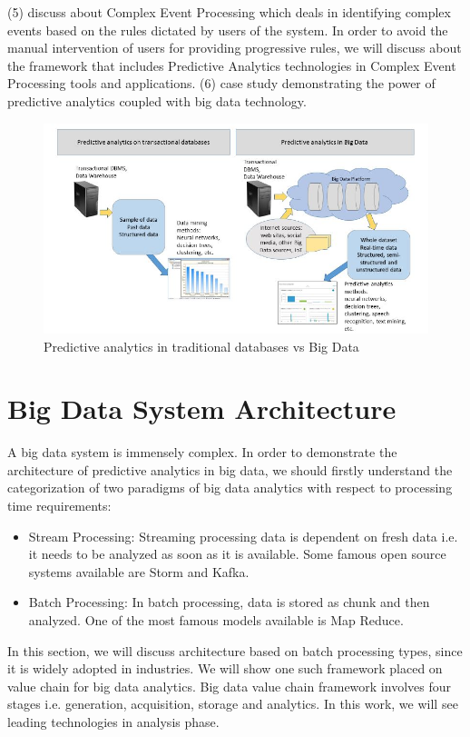 \documentclass[runningheads]{llncs}
\begin{document}
(5) discuss about Complex Event Processing which deals in identifying complex events based on the rules dictated by users of the system. In order to avoid the manual intervention of users for providing progressive rules, we will discuss about the framework that includes Predictive Analytics technologies in Complex Event Processing tools and applications. \newline
(6) case study demonstrating the power of predictive analytics coupled with big data technology.
\begin{figure}[htbp]
	\centering
	\vspace{-0.5em}
	\hspace*{-0.45cm}
	\includegraphics[scale=0.6]{Figure3.jpg}
	\caption{Predictive analytics in traditional databases vs Big Data}
	\label{fig:Figure3}
	\vspace{-0.5em}
\end{figure}
\section{Big Data System Architecture}
A big data system is immensely complex. In order to demonstrate the architecture of predictive analytics in big data, we should firstly understand the categorization of two paradigms of big data analytics with respect to processing time requirements:
\begin{itemize}
	\item Stream Processing: Streaming processing data is dependent on fresh data i.e. it needs to be analyzed as soon as it is available. Some famous open source systems available are Storm and Kafka.
	\item Batch Processing: In batch processing, data is stored as chunk and then analyzed. One of the most famous models available is Map Reduce.
\end{itemize}
In this section, we will discuss architecture based on batch processing types, since it is widely adopted in industries. We will show one such framework placed on value chain for big data analytics\cite{5}. Big data value chain framework involves four stages i.e. generation, acquisition, storage and analytics. In this work, we will see leading technologies in analysis phase.
\end{document}
